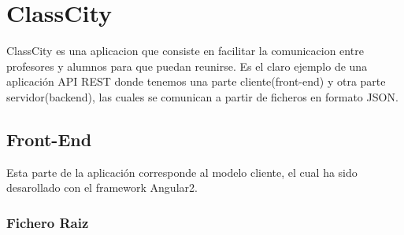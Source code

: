 \chapter{ClassCity}
ClassCity es una aplicacion que consiste en facilitar la comunicacion entre profesores y alumnos para que puedan reunirse. Es el claro ejemplo de una aplicación API REST donde tenemos una parte cliente(front-end) y otra parte servidor(backend), las cuales se comunican a partir de ficheros en formato JSON.

\section{Front-End}
Esta parte de la aplicación corresponde al modelo cliente, el cual ha sido desarollado con el framework Angular2. 

\subsection{Fichero Raiz}

